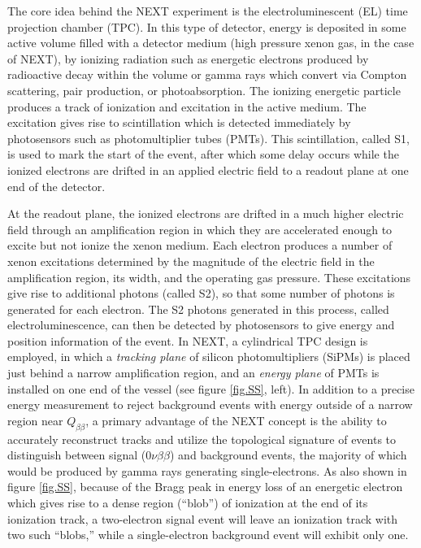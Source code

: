 \documentclass[11pt,a4paper]{article}
\begin{document}
The core idea behind the NEXT experiment is the electroluminescent (EL) time projection chamber (TPC). In this type of detector, energy is deposited in some active volume filled with a detector medium (high pressure xenon gas, in the case of NEXT), by ionizing radiation such as energetic electrons produced by radioactive decay within the volume or gamma rays which convert via Compton scattering, pair production, or photoabsorption. The ionizing energetic particle produces a track of ionization and excitation in the active medium. The excitation gives rise to scintillation which is detected immediately by photosensors such as photomultiplier tubes (PMTs). This scintillation, called S1, is used to mark the start of the event, after which some delay occurs while the ionized electrons are drifted in an applied electric field to a readout plane at one end of the detector. 

At the readout plane, the ionized electrons are drifted in a much higher electric field through an amplification region in which they are accelerated enough to excite but not ionize the xenon medium.  Each electron produces a number of xenon excitations determined by the magnitude of the electric field in the amplification region, its width, and the operating gas pressure.  These excitations give rise to additional photons (called S2), so that some number of photons is generated for each electron.  The S2 photons generated in this process, called electroluminescence, can then be detected by photosensors to give energy and position information of the event. In NEXT, a cylindrical TPC design is employed, in which a \emph{tracking plane} of silicon photomultipliers (SiPMs) is placed just behind a narrow amplification region, and an \emph{energy plane} of PMTs is installed on one end of the vessel (see figure \ref{fig.SS}, left). In addition to a precise energy measurement to reject background events with energy outside of a narrow region near $Q_{\beta\beta}$, a primary advantage of the NEXT concept is the ability to accurately reconstruct tracks and utilize the topological signature of events to distinguish between signal ($0\nu\beta\beta$) and background events, the majority of which would be produced by gamma rays generating single-electrons.  As also shown in figure \ref{fig.SS}, because of the Bragg peak in energy loss of an energetic electron which gives rise to a dense region (``blob'') of ionization at the end of its ionization track, a two-electron signal event will leave an ionization track with two such ``blobs,'' while a single-electron background event will exhibit only one.
\end{document}
